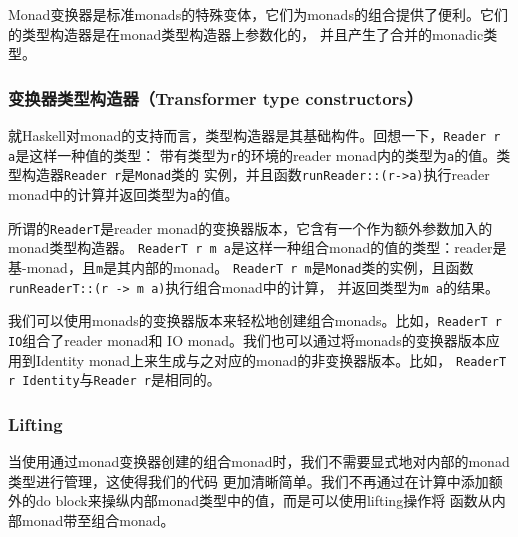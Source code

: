 \indent{}Monad变换器是标准monads的特殊变体，它们为monads的组合提供了便利。它们的类型构造器是在monad类型构造器上参数化的，
并且产生了合并的monadic类型。

\vspace{-0.5em}
\subsubsection{变换器类型构造器（Transformer type constructors）}
\indent{}就Haskell对monad的支持而言，类型构造器是其基础构件。回想一下，\texttt{Reader r a}是这样一种值的类型：
带有类型为\texttt{r}的环境的reader monad内的类型为\texttt{a}的值。类型构造器\texttt{Reader r}是\texttt{Monad}类的
实例，并且函数\texttt{runReader::(r->a)}执行reader monad中的计算并返回类型为\texttt{a}的值。

\indent{}所谓的\texttt{ReaderT}是reader monad的变换器版本，它含有一个作为额外参数加入的monad类型构造器。
\texttt{ReaderT r m a}是这样一种组合monad的值的类型：reader是基-monad，且\texttt{m}是其内部的monad。
\texttt{ReaderT r m}是\texttt{Monad}类的实例，且函数\texttt{runReaderT::(r -> m a)}执行组合monad中的计算，
并返回类型为\texttt{m a}的结果。

\indent{}我们可以使用monads的变换器版本来轻松地创建组合monads。比如，\texttt{ReaderT r IO}组合了reader monad和
IO monad。我们也可以通过将monads的变换器版本应用到Identity monad上来生成与之对应的monad的非变换器版本。比如，
\texttt{ReaderT r Identity}与\texttt{Reader r}是相同的。

\vspace{-0.5em}
\subsubsection{Lifting}
\indent{}当使用通过monad变换器创建的组合monad时，我们不需要显式地对内部的monad类型进行管理，这使得我们的代码
更加清晰简单。我们不再通过在计算中添加额外的do block来操纵内部monad类型中的值，而是可以使用lifting操作将
函数从内部monad带至组合monad。

